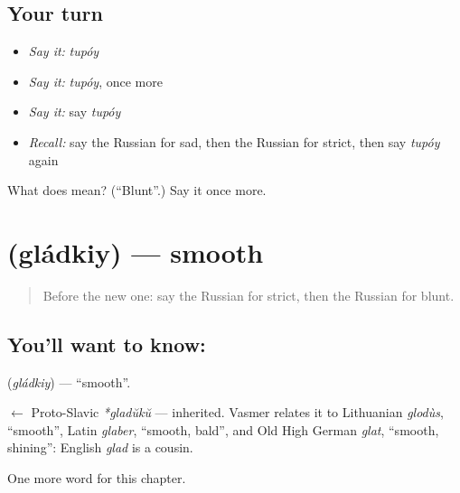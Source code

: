 \subsection*{Your turn}
\begin{itemize}
\raggedright
  \item \emph{Say it:} \emph{tupóy}
  \item \emph{Say it:} \emph{tupóy}, once more
  \item \emph{Say it:} say \emph{tupóy}
  \item \emph{Recall:} say the Russian for sad, then the Russian for strict, then say \emph{tupóy} again
\end{itemize}

\begin{tcolorbox}[breakable,colback=teal!4,colframe=teal!35!black,title={Before you move on}]
What does  mean? (\textquotedblleft{}Blunt\textquotedblright{}.) Say it once more.
\end{tcolorbox}
\section[\texorpdfstring{\ru{гладкий} (gládkiy)}{гладкий (gládkiy)}]{ (gládkiy) — smooth}

\label{lesson:RU-C217-gladkiy}



\begin{quote}
Before the new one: say the Russian for strict, then the Russian for blunt.
\end{quote}

\subsection*{You'll want to know: }
\textbf{} (\emph{gládkiy}) — \textquotedblleft{}smooth\textquotedblright{}.

\begin{cousinweb}
\textbf{} $\leftarrow$ Proto-Slavic \emph{*gladŭkŭ} — inherited. Vasmer relates it to Lithuanian \emph{glodùs}, \textquotedblleft{}smooth\textquotedblright{}, Latin \emph{glaber}, \textquotedblleft{}smooth, bald\textquotedblright{}, and Old High German \emph{glat}, \textquotedblleft{}smooth, shining\textquotedblright{}: English \emph{glad} is a cousin.
\end{cousinweb}

\begin{grammarlens}[title={What you've built}]
One more word for this chapter.
\end{grammarlens}

